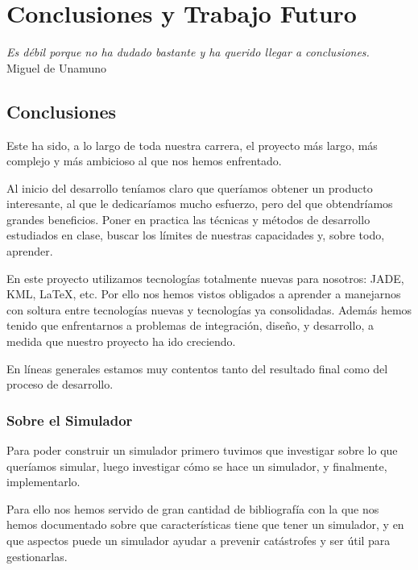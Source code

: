 \chapter{Conclusiones y Trabajo Futuro} \label{cap7}

\begin{flushright}
\begin{minipage}{7.85cm}
    {\em Es débil porque no ha dudado bastante y ha querido llegar a
    conclusiones.} \\ Miguel de Unamuno
\end{minipage}
\end{flushright}

\vspace*{5mm}

\section{Conclusiones}

Este ha sido, a lo largo de toda nuestra carrera, el proyecto más largo, más
complejo y más ambicioso al que nos hemos enfrentado.

Al inicio del desarrollo teníamos claro que queríamos obtener un producto
interesante, al que le dedicaríamos mucho esfuerzo, pero del que obtendríamos
grandes beneficios. Poner en practica las técnicas y métodos de desarrollo
estudiados en clase, buscar los límites de nuestras capacidades y, sobre todo,
aprender.

En este proyecto utilizamos tecnologías totalmente nuevas para nosotros: JADE,
KML, \LaTeX{}, etc. Por ello nos hemos vistos obligados a aprender a manejarnos
con soltura entre tecnologías nuevas y tecnologías ya consolidadas. Además hemos
tenido que enfrentarnos a problemas de integración, diseño, y desarrollo, a
medida que nuestro proyecto ha ido creciendo.

En líneas generales estamos muy contentos tanto del resultado final como del
proceso de desarrollo.

\subsection{Sobre el Simulador}

Para poder construir un simulador primero tuvimos que investigar sobre lo
que queríamos simular, luego investigar cómo se hace un simulador, y
finalmente, implementarlo.

Para ello nos hemos servido de gran cantidad de bibliografía con la que nos
hemos documentado sobre que características tiene que tener un simulador, y en
que aspectos puede un simulador ayudar a prevenir catástrofes y ser útil para
gestionarlas.

